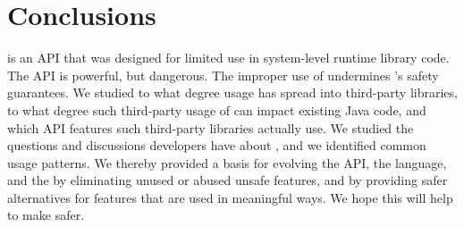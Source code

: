 \section{Conclusions}
\label{sec:conclusions}

\smu{} is an API that was designed for limited use in system-level runtime library code.
The \unsafe{} API is powerful, but dangerous.
The improper use of \unsafe{} undermines \java{}'s safety guarantees.
We studied to what degree \unsafe{} usage has spread into third-party libraries,
to what degree such third-party usage of \unsafe{} can impact existing Java code,
and which \unsafe{} API features such third-party libraries actually use.
We studied the questions and discussions developers have about \unsafe{},
and we identified common usage patterns.
We thereby provided a basis for evolving the \unsafe{} API, the \java{} language, and the \jvm{}
by eliminating unused or abused unsafe features,
and by providing safer alternatives for features that are used in meaningful ways.
We hope this will help to make \unsafe{} safer.